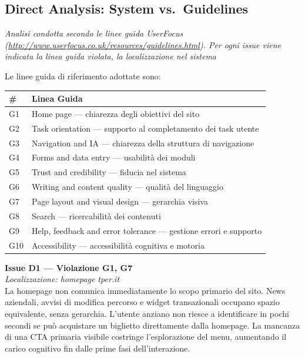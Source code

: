 \documentclass[11pt,a4paper]{article}
\begin{document}
\subsection*{Direct Analysis: System vs.\ Guidelines}

\noindent\textit{Analisi condotta secondo le linee guida UserFocus (\url{http://www.userfocus.co.uk/resources/guidelines.html}). Per ogni issue viene indicata la linea guida violata, la localizzazione nel sistema}

\bigskip

\noindent Le linee guida di riferimento adottate sono:

\begin{tabular}{ll}
\hline
\textbf{\#} & \textbf{Linea Guida} \\
\hline
G1 & Home page — chiarezza degli obiettivi del sito \\
G2 & Task orientation — supporto al completamento dei task utente \\
G3 & Navigation and IA — chiarezza della struttura di navigazione \\
G4 & Forms and data entry — usabilità dei moduli \\
G5 & Trust and credibility — fiducia nel sistema \\
G6 & Writing and content quality — qualità del linguaggio \\
G7 & Page layout and visual design — gerarchia visiva \\
G8 & Search — ricercabilità dei contenuti \\
G9 & Help, feedback and error tolerance — gestione errori e supporto \\
G10 & Accessibility — accessibilità cognitiva e motoria \\
\hline
\end{tabular}

\bigskip

\noindent\textbf{Issue D1 — Violazione G1, G7}\label{iss:D1}\\
\textit{Localizzazione: homepage tper.it}\\

\noindent La homepage non comunica immediatamente lo scopo primario del sito. News aziendali, avvisi di modifica percorso e widget transazionali occupano spazio equivalente, senza gerarchia. L'utente anziano non riesce a identificare in pochi secondi se può acquistare un biglietto direttamente dalla homepage. La mancanza di una CTA primaria visibile costringe l'esplorazione del menu, aumentando il carico cognitivo fin dalle prime fasi dell'interazione.
\end{document}
